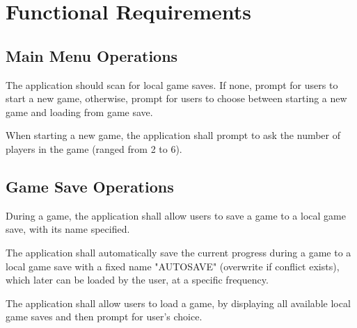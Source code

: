   \section{Functional Requirements}

    \subsection{Main Menu Operations}
      \begin{enumerate}[label=\texttt{[FUNC-REQ-\arabic*]}:, leftmargin=10em]
        \item The application should scan for local game saves. If none, prompt for users to start a new game, otherwise, prompt for users to choose between starting a new game and loading from game save.
        \item When starting a new game, the application shall prompt to ask the number of players in the game (ranged from 2 to 6).
      \end{enumerate}

    \subsection{Game Save Operations}
      \begin{enumerate}[label=\texttt{[FUNC-REQ-\arabic*]}:, start=2, leftmargin=10em]
        \item During a game, the application shall allow users to save a game to a local game save, with its name specified.
        \item The application shall automatically save the current progress during a game to a local game save with a fixed name "AUTOSAVE" (overwrite if conflict exists), which later can be loaded by the user, at a specific frequency.
        \item The application shall allow users to load a game, by displaying all available local game saves and then prompt for user's choice.
      \end{enumerate}

